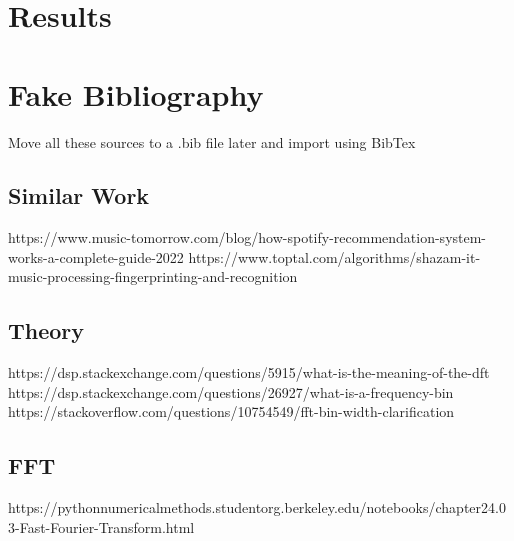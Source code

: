 \documentclass[conference]{IEEEtran}
\begin{document}
\section{Results}

\section{Fake Bibliography}
Move all these sources to a .bib file later and import using BibTex
\subsection{Similar Work}
https://www.music-tomorrow.com/blog/how-spotify-recommendation-system-works-a-complete-guide-2022
https://www.toptal.com/algorithms/shazam-it-music-processing-fingerprinting-and-recognition
\subsection{Theory}
https://dsp.stackexchange.com/questions/5915/what-is-the-meaning-of-the-dft
https://dsp.stackexchange.com/questions/26927/what-is-a-frequency-bin
https://stackoverflow.com/questions/10754549/fft-bin-width-clarification
\subsection{FFT}
https://pythonnumericalmethods.studentorg.berkeley.edu/notebooks/chapter24.03-Fast-Fourier-Transform.html
\end{document}
